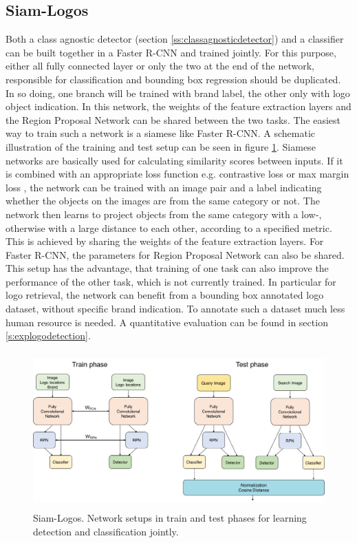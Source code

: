 \subsection{Siam-Logos}\label{ss:solution5}
Both a class agnostic detector (section \ref{ss:classagnosticdetector}) and a classifier can be built together in a Faster R-CNN and trained jointly. For this purpose, either all fully connected layer or only the two at the end of the network, responsible for classification and bounding box regression should be duplicated. In so doing, one branch will be trained with brand label, the other only with logo object indication. In this network, the weights of the feature extraction layers and the Region Proposal Network can be shared between the two tasks. The easiest way to train such a network is a siamese like Faster R-CNN. A schematic illustration of the training and test setup can be seen in figure \ref{f:jointlearning}.
\bigbreak
Siamese networks \cite{Hadsell06dimensionalityreduction} are basically used for calculating similarity scores between inputs. If it is combined with an appropriate loss function e.g. contrastive loss \cite{Hadsell06dimensionalityreduction} or max margin loss \cite{Simonyan13}\cite{ies_2016_herrmann_low_quality}, the network can be trained with an image pair and a label indicating whether the objects on the images are from the same category or not. The network then learns to project objects from the same category with a low-, otherwise with a large distance to each other, according to a specified metric. This is achieved by sharing the weights of the feature extraction layers.
\bigbreak
For Faster R-CNN, the parameters for Region Proposal Network can also be shared. This setup has the advantage, that training of one task can also improve the performance of the other task, which is not currently trained. In particular for logo retrieval, the network can benefit from a bounding box annotated logo dataset, without specific brand indication. To annotate such a dataset much less human resource is needed. A quantitative evaluation can be found in section \ref{s:explogodetection}.
\begin{figure}
  \centering
  \includegraphics[height=60mm]{images/mt/sol5_arch.jpg}
\caption{Siam-Logos. Network setups in train and test phases for learning detection and classification jointly.}
\label{f:jointlearning}
\end{figure}

